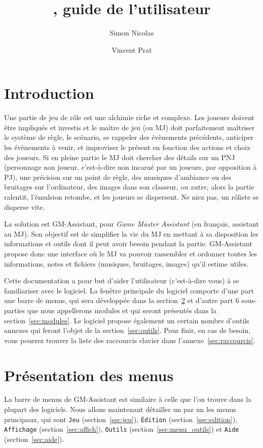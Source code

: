 \documentclass[a4paper,12pt]{article}
\title{\GMA \versionnumber, guide de l'utilisateur}
\author{Simon Nicolas \and Vincent Prat}
\newcommand*{\GMA}{GM-Assistant\xspace}
\newcommand*{\interfaceitem}[1]{\texttt{#1}}
\begin{document}
\maketitle

\tableofcontents

\section{Introduction}

Une partie de jeu de rôle est une alchimie riche et complexe.
Les joueurs doivent être impliqués et investis et le maître de jeu (ou MJ) doit parfaitement maîtriser le système de règle, le scénario, se rappeler des évènements précédents, anticiper les évènements à venir, et improviser le présent en fonction des actions et choix des joueurs.
Si en pleine partie le MJ doit chercher des détails sur un PNJ (personnage non joueur, c'est-à-dire non incarné par un joueurs, par opposition à PJ), une précision sur un point de règle, des musiques d'ambiance ou des bruitages sur l'ordinateur, des images dans son classeur, ou autre, alors la partie ralentit, l'émulsion retombe, et les joueurs se dispersent.
Ne niez pas, un rôliste se disperse vite.

La solution est \GMA, pour \emph{Game Master Assistant} (en français, assistant au MJ).
Son objectif est de simplifier la vie du MJ en mettant à sa disposition les informations et outils dont il peut avoir besoin pendant la partie.
\GMA propose donc une interface où le MJ va pouvoir rassembler et ordonner toutes les informations, notes et fichiers (musiques, bruitages, images) qu'il estime utiles.

Cette documentation a pour but d'aider l'utilisateur (c'est-à-dire vous) à se familiariser avec le logiciel.
La fenêtre principale du logiciel comporte d'une part une barre de menus, qui sera développée dans la section~\ref{menu} et d'autre part 6 sous-parties que nous appellerons modules et qui seront présentés dans la section~\ref{sec:modules}.
Le logiciel propose également un certain nombre d'outils annexes qui feront l'objet de la section~\ref{sec:outils}.
Pour finir, en cas de besoin, vous pourrez trouver la liste des raccourcis clavier dans l'annexe~\ref{sec:raccourcis}. 

\section{Présentation des menus}
\label{menu}

La barre de menus de \GMA est similaire à celle que l'on trouve dans la plupart des logiciels.
Nous allons maintenant détailler un par un les menus principaux, qui sont \interfaceitem{Jeu} (section~\ref{sec:jeu}), \interfaceitem{Édition} (section~\ref{sec:edition}), \interfaceitem{Affichage} (section~\ref{sec:affich}), \interfaceitem{Outils} (section~\ref{sec:menu_outils}) et \interfaceitem{Aide} (section~\ref{sec:aide}).
\end{document}
